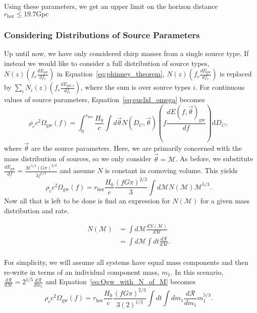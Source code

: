 \documentclass[]{article}
\newcommand{\Ogw}{\Omega_{\mathrm{gw}}}
\newcommand{\rhor}{r_{\text{hor}}}
\begin{document}
Using these parameters, we get an upper limit on the horizon distance $\boxed{r_{\text{hor}} \leq 19.7 \mathrm{Gpc}}$

\subsubsection{Considering Distributions of Source Parameters}
Up until now, we have only considered chirp masses from a single source type.
If instead we would like to consider a full distribution of source types, $N(z) (f_r \frac{dE_{\mathrm{gw}}}{df_r})$ in Equation~\ref{eq:phinney_theorem}, $N(z) (f_r \frac{dE_{\mathrm{gw}}}{df_r})$ is replaced by $\sum_{i} N_i (z) (f_r \frac{dE_{\mathrm{gw},i}}{df_r})$, where the sum is over source types $i$. 
For continuous values of source parameters, Equation~\ref{eq:euclid_omega} becomes
\begin{equation*}
\rho_c c^2 \Ogw(f) =  \int_{0}^{\rhor} \frac{H_0}{c} \int d\vec{\theta} N(D_C,\vec{\theta}) (f \frac{dE(f,\vec{\theta})_{\mathrm{gw}}}{df}) \mathrm{d}D_C ,
\end{equation*}
where $\vec{\theta}$ are the source parameters. 
Here, we are primarily concerned with the mass distribution of sources, so we only consider $\vec{\theta} = \mathcal{M}$.
As before, we substitute $\frac{dE_{\mathrm{gw}}}{df} = \frac{\mathcal{M}^{5/3}(G\pi)^{2/3}}{3 f^{1/3}}$ and assume $N$ is constant in comoving volume. 
This yields
\begin{equation}
\rho_c c^2 \Ogw(f) =  \rhor \frac{H_0}{c} \frac{(f G \pi)^{2/3}}{3} \int d\mathcal{M} N(\mathcal{M}) \mathcal{M}^{5/3}  .
\label{eq:Ogw_with_N_of_M}
\end{equation}
Now all that is left to be done is find an expression for $N(\mathcal{M})$ for a given mass distribution and rate.

\begin{align*}
 N(\mathcal{M}) &= \int d\mathcal{M} \frac{d N(\mathcal{M})}{d\mathcal{M}} \\
  &= \int d\mathcal{M} \int dt \frac{d\mathcal{R}}{d\mathcal{M}}.\\
\end{align*}

For simplicity, we will assume all systems have equal mass components and then re-write in terms of an individual component mass, $m_1$.
In this scenario, $\frac{d\mathcal{R}}{d\mathcal{M}} = 2^{1/5} \frac{d\mathcal{R}}{d m_1}$ and Equation~\ref{eq:Ogw_with_N_of_M} becomes
\begin{equation}
\rho_c c^2 \Ogw(f) =  \rhor \frac{H_0}{c} \frac{(f G \pi)^{2/3}}{3 (2)^{1/3}} \int d t \int d m_1 \frac{d\mathcal{R}}{dm_1} m_1^{5/3} .
\label{eq:Ogw_with_R_of_M}
\end{equation}
\end{document}
